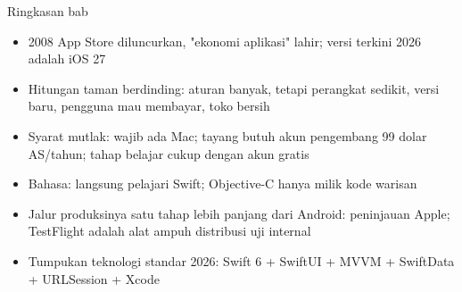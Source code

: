 \begin{tcbsummary}{Ringkasan bab}
\begin{itemize}
  \item 2008 App Store diluncurkan, "ekonomi aplikasi" lahir; versi terkini 2026 adalah iOS 27
  \item Hitungan taman berdinding: aturan banyak, tetapi perangkat sedikit, versi baru, pengguna mau membayar, toko bersih
  \item Syarat mutlak: wajib ada Mac; tayang butuh akun pengembang 99 dolar AS/tahun; tahap belajar cukup dengan akun gratis
  \item Bahasa: langsung pelajari Swift; Objective-C hanya milik kode warisan
  \item Jalur produksinya satu tahap lebih panjang dari Android: peninjauan Apple; TestFlight adalah alat ampuh distribusi uji internal
  \item Tumpukan teknologi standar 2026: Swift 6 + SwiftUI + MVVM + SwiftData + URLSession + Xcode
\end{itemize}

\end{tcbsummary}
